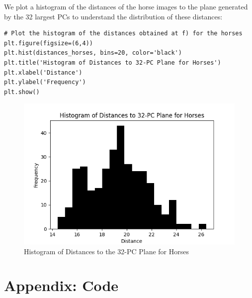 \documentclass{article}
\begin{document}
We plot a histogram of the distances of the horse images to the plane generated by the 32 largest PCs to understand the distribution of these distances:

\begin{verbatim}
# Plot the histogram of the distances obtained at f) for the horses
plt.figure(figsize=(6,4))
plt.hist(distances_horses, bins=20, color='black')
plt.title('Histogram of Distances to 32-PC Plane for Horses')
plt.xlabel('Distance')
plt.ylabel('Frequency')
plt.show()
\end{verbatim}

\begin{figure}[ht]
    \centering
    \includegraphics[width=.6\textwidth]{hist_distances_horses.png}
    \caption{Histogram of Distances to the 32-PC Plane for Horses}
    \label{fig:hist_distances_horses}
\end{figure}

\newpage
\section*{Appendix: Code}
\end{document}
